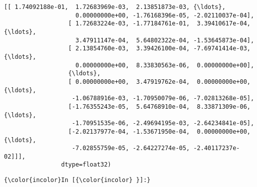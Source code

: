 \documentclass[11pt]{article}
\begin{document}
\begin{Verbatim}[commandchars=\\\{\}]
                 [[ 1.74092188e-01,  1.72683969e-03,  2.13851873e-03, {\ldots},
                    0.00000000e+00, -1.76168396e-05, -2.02110037e-04],
                  [ 1.72683224e-03, -1.77184761e-01,  3.39410617e-04, {\ldots},
                    3.47911147e-04,  5.64802322e-04, -1.53645873e-04],
                  [ 2.13854760e-03,  3.39426100e-04, -7.69741414e-03, {\ldots},
                    0.00000000e+00,  8.33830563e-06,  0.00000000e+00],
                  {\ldots},
                  [ 0.00000000e+00,  3.47919762e-04,  0.00000000e+00, {\ldots},
                   -1.06788916e-03, -1.70950079e-06, -7.02813268e-05],
                  [-1.76355243e-05,  5.64768910e-04,  8.33871309e-06, {\ldots},
                   -1.70951535e-06, -2.49694195e-03, -2.64234841e-05],
                  [-2.02137977e-04, -1.53671950e-04,  0.00000000e+00, {\ldots},
                   -7.02855759e-05, -2.64227274e-05, -2.40117237e-02]]],
                dtype=float32)
\end{Verbatim}
            
    \begin{Verbatim}[commandchars=\\\{\}]
{\color{incolor}In [{\color{incolor} }]:} 
\end{Verbatim}


    
    
    
    
\end{document}
